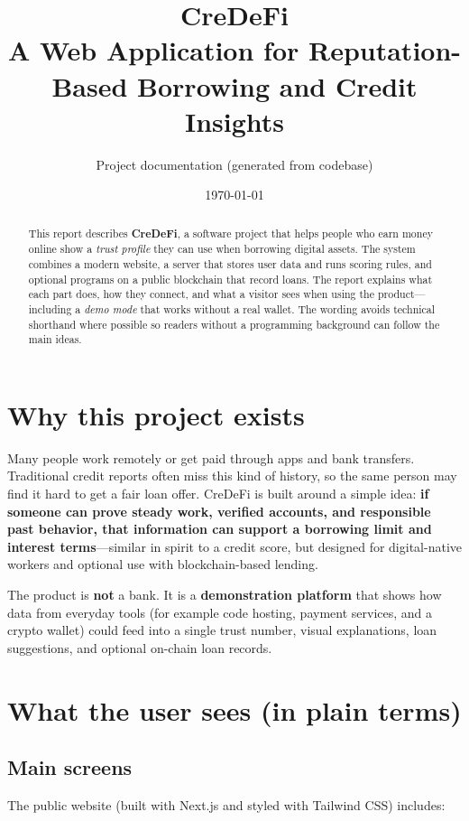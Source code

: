 \documentclass[11pt,a4paper]{article}
\title{\textbf{CreDeFi}\\[0.4em]
\large A Web Application for Reputation-Based Borrowing and Credit Insights}
\author{Project documentation (generated from codebase)}
\date{\today}
\begin{document}
\maketitle

\begin{abstract}
This report describes \textbf{CreDeFi}, a software project that helps people who earn money online show a \emph{trust profile} they can use when borrowing digital assets. The system combines a modern website, a server that stores user data and runs scoring rules, and optional programs on a public blockchain that record loans. The report explains what each part does, how they connect, and what a visitor sees when using the product---including a \emph{demo mode} that works without a real wallet. The wording avoids technical shorthand where possible so readers without a programming background can follow the main ideas.
\end{abstract}

\tableofcontents
\newpage

\section{Why this project exists}
Many people work remotely or get paid through apps and bank transfers. Traditional credit reports often miss this kind of history, so the same person may find it hard to get a fair loan offer. CreDeFi is built around a simple idea: \textbf{if someone can prove steady work, verified accounts, and responsible past behavior, that information can support a borrowing limit and interest terms}---similar in spirit to a credit score, but designed for digital-native workers and optional use with blockchain-based lending.

The product is \textbf{not} a bank. It is a \textbf{demonstration platform} that shows how data from everyday tools (for example code hosting, payment services, and a crypto wallet) could feed into a single trust number, visual explanations, loan suggestions, and optional on-chain loan records.

\section{What the user sees (in plain terms)}
\subsection{Main screens}
The public website (built with Next.js and styled with Tailwind CSS) includes:
\end{document}
